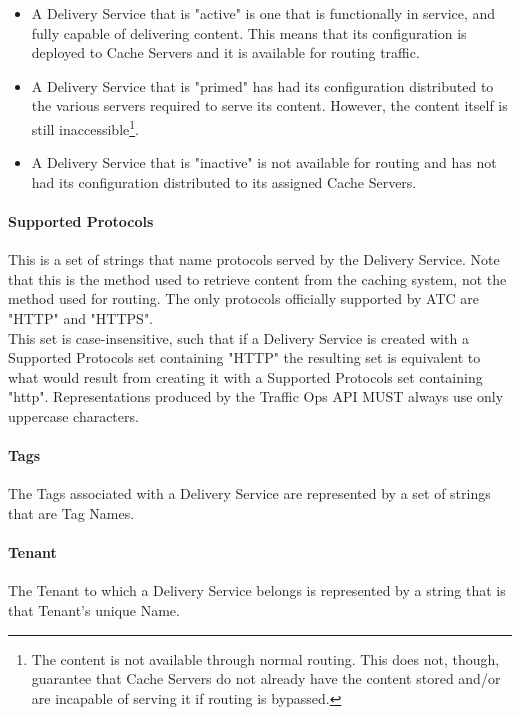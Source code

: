 \begin{itemize}
	\item {} A Delivery Service that is "active" is one that is
	functionally in service, and fully capable of delivering content. This means
	that its configuration is deployed to Cache Servers and it is available for
	routing traffic.
	\item {} A Delivery Service that is "primed" has had its
	configuration distributed to the various servers required to serve its
	content. However, the content itself is still inaccessible\footnote{The
	content is not available through normal routing. This does not, though,
	guarantee that Cache Servers do not already have the content stored and/or
	are incapable of serving it if routing is bypassed.}.
	\item {} A Delivery Service that is "inactive" is not available
	for routing and has not had its configuration distributed to its assigned
	Cache Servers.
\end{itemize}

\paragraph{Supported Protocols}
This is a set of strings that name protocols served by the Delivery Service.
Note that this is the method used to retrieve content from the caching system,
not the method used for routing. The only protocols officially supported by ATC
are "HTTP" and "HTTPS".\\
This set is case-insensitive, such that if a Delivery Service is created with a
Supported Protocols set containing "HTTP" the resulting set is equivalent to
what would result from creating it with a Supported Protocols set containing
"http". Representations produced by the Traffic Ops API MUST always use
only uppercase characters.

\paragraph{Tags}
The Tags associated with a Delivery Service are represented by a set of strings
that are Tag Names.

\paragraph{Tenant}
The Tenant to which a Delivery Service belongs is represented by a string that
is that Tenant's unique Name.

